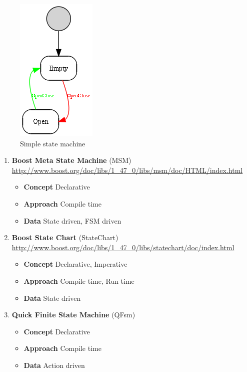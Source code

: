 \begin{figure}[htbp]
    \centering
    \includegraphics[scale=0.8]{images/simple.png}
    \caption[Simple state machine]{Simple state machine}
\end{figure}

\begin{enumerate}
\item \textbf{Boost Meta State Machine} (MSM)\\
\url{http://www.boost.org/doc/libs/1\_47\_0/libs/msm/doc/HTML/index.html}
\begin{itemize}
\item \textbf{Concept} Declarative
\item \textbf{Approach} Compile time
\item \textbf{Data} State driven, FSM driven
\end{itemize}


\newpage
\item \textbf{Boost State Chart} (StateChart)\\
\url{http://www.boost.org/doc/libs/1\_47\_0/libs/statechart/doc/index.html}
\begin{itemize}
\item \textbf{Concept} Declarative, Imperative
\item \textbf{Approach} Compile time, Run time
\item \textbf{Data} State driven
\end{itemize}



\item \textbf{Quick Finite State Machine} (QFsm)
\begin{itemize}
\item \textbf{Concept} Declarative
\item \textbf{Approach} Compile time
\item \textbf{Data} Action driven
\end{itemize}


\end{enumerate}

